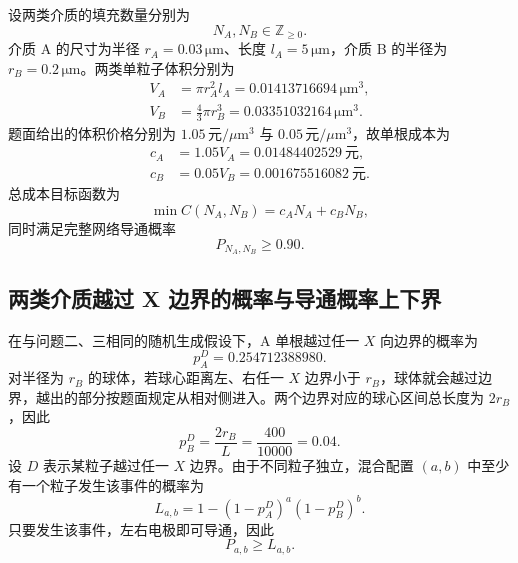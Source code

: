 \documentclass[withoutpreface,bwprint]{cumcmthesis}
\begin{document}
设两类介质的填充数量分别为
\[
N_A,N_B\in\mathbb Z_{\ge0}.
\]
介质 A 的尺寸为半径 $r_A=0.03\,\mathrm{\mu m}$、长度 $l_A=5\,\mathrm{\mu m}$，介质 B 的半径为 $r_B=0.2\,\mathrm{\mu m}$。两类单粒子体积分别为
\begin{align}
V_A&=\pi r_A^2l_A=0.01413716694\,\mathrm{\mu m^3},\\
V_B&=\frac43\pi r_B^3=0.03351032164\,\mathrm{\mu m^3}.
\end{align}
题面给出的体积价格分别为 $1.05\,\text{元}/\mu\mathrm{m}^3$ 与 $0.05\,\text{元}/\mu\mathrm{m}^3$，故单根成本为
\begin{align}
c_A&=1.05V_A=0.01484402529\ \text{元},\\
c_B&=0.05V_B=0.001675516082\ \text{元}.
\label{eq:q4-unit-cost}
\end{align}
总成本目标函数为
\begin{equation}
\min C(N_A,N_B)=c_AN_A+c_BN_B,
\label{eq:q4-objective}
\end{equation}
同时满足完整网络导通概率
\begin{equation}
P_{N_A,N_B}\ge0.90.
\label{eq:q4-reliability}
\end{equation}

\subsection{两类介质越过 X 边界的概率与导通概率上下界}

在与问题二、三相同的随机生成假设下，A 单根越过任一 $X$ 向边界的概率为
\begin{equation}
p_A^D=0.254712388980.
\end{equation}
对半径为 $r_B$ 的球体，若球心距离左、右任一 $X$ 边界小于 $r_B$，球体就会越过边界，越出的部分按题面规定从相对侧进入。两个边界对应的球心区间总长度为 $2r_B$，因此
\begin{equation}
p_B^D=\frac{2r_B}{L}=\frac{400}{10000}=0.04.
\label{eq:q4-pb}
\end{equation}
设 $D$ 表示某粒子越过任一 $X$ 边界。由于不同粒子独立，混合配置 $(a,b)$ 中至少有一个粒子发生该事件的概率为
\begin{equation}
L_{a,b}=1-(1-p_A^D)^a(1-p_B^D)^b.
\label{eq:q4-lower}
\end{equation}
只要发生该事件，左右电极即可导通，因此
\[
P_{a,b}\ge L_{a,b}.
\]
\end{document}
